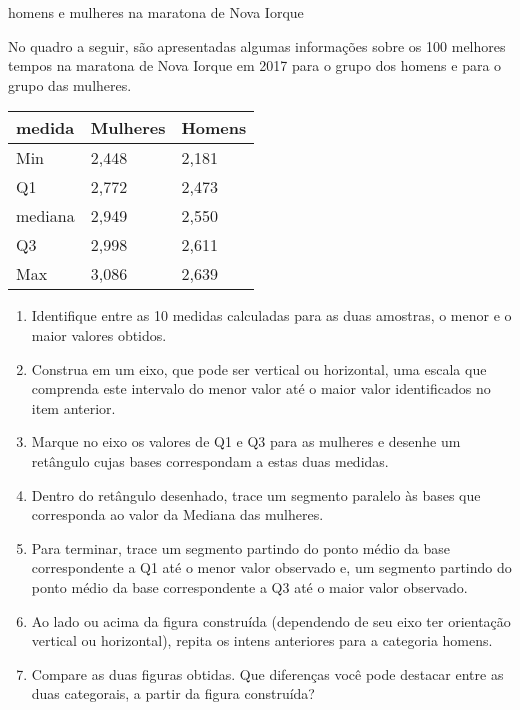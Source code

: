 \begin{task}{homens e mulheres na maratona de Nova Iorque}
\label{\detokenize{PE104-6:atividade-homens-e-mulheres-na-maratona-de-nova-iorque}}\label{\detokenize{PE104-6:ativ-construcao-do-boxplot}}

No quadro a seguir, são apresentadas algumas informações sobre os 100 melhores tempos na maratona de Nova Iorque em 2017 para o grupo dos homens e para o grupo das mulheres.


\begin{savenotes}\sphinxattablestart
\centering
{}
\label{\detokenize{PE104-6:id1}}
\sphinxaftercaption
\begin{tabulary}{\linewidth}[t]{|T|T|T|}
\hline

medida
&
Mulheres
&
Homens
\\
\hline
Min
&
2,448
&
2,181
\\
\hline
Q1
&
2,772
&
2,473
\\
\hline
mediana
&
2,949
&
2,550
\\
\hline
Q3
&
2,998
&
2,611
\\
\hline
Max
&
3,086
&
2,639
\\
\hline
\end{tabulary}
\par
\sphinxattableend\end{savenotes}
\begin{enumerate}
\item {} 
Identifique entre as 10 medidas calculadas para as duas amostras, o menor e o maior valores obtidos.

\item {} 
Construa em um eixo, que pode ser vertical ou horizontal, uma escala que comprenda este intervalo do menor valor até o maior valor identificados no item anterior.

\item {} 
Marque no eixo os valores de Q1 e Q3  para as mulheres e desenhe um retângulo cujas bases correspondam a estas duas medidas.

\item {} 
Dentro do retângulo desenhado, trace um segmento paralelo às bases que corresponda ao valor da Mediana das mulheres.

\item {} 
Para terminar, trace um segmento partindo do ponto médio da base correspondente a Q1 até o menor valor observado e, um segmento partindo do ponto médio da base correspondente a Q3 até o maior valor observado.

\item {} 
Ao lado ou acima da figura construída (dependendo de seu eixo ter orientação vertical ou horizontal), repita os intens anteriores para a categoria homens.

\item {} 
Compare as duas figuras obtidas. Que diferenças você pode destacar entre as duas categorais, a partir da figura construída?

\end{enumerate}
\end{task}




